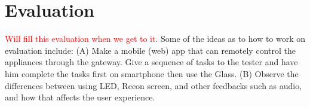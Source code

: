 \section{Evaluation}
\label{sec:evaluation}


\textcolor{red}{Will fill this evaluation when we get to it.}
Some of the ideas as to how to work on evaluation include: (A) Make a mobile (web) app that can remotely control the appliances through the gateway. Give a sequence of tasks to the tester and have him complete the tasks first on smartphone then use the Glass. (B) Observe the differences between using LED, Recon screen, and other feedbacks such as audio, and how that affects the user experience.

